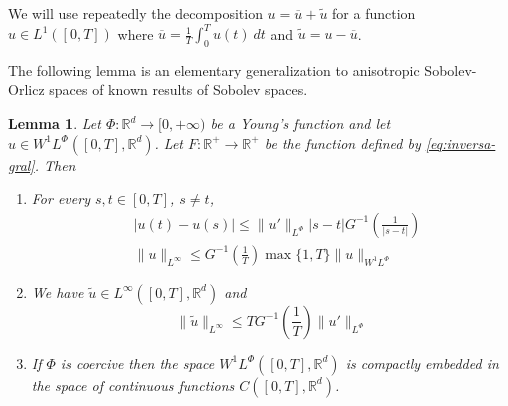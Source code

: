 \documentclass[twoside]{article}
\newtheorem{lem}[thm]{Lemma}
\theoremstyle{remark}
\newcommand{\orlnor}{\|_{L^{\Phi}}}
\newcommand{\linf}{\|_{L^{\infty}}}
\newcommand{\lphi}{L^{\Phi}}
\newcommand{\wphi}{W^{1}\lphi}
\newcommand{\sobnor}{\|_{W^{1}\lphi}}
\newcommand{\rr}{\mathbb{R}}
\renewcommand{\leq}{\leqslant}
\newcounter{example}
\begin{document}
%
%
 We will use repeatedly the decomposition $u=\overline{u}+\widetilde{u}$ for a function $u\in L^1([0,T])$  where $\overline{u} =\frac1T\int_0^T u(t)\ dt$ and $\widetilde{u}=u-\overline{u}$.

 The following lemma is an elementary generalization to anisotropic Sobolev-Orlicz spaces of known results of Sobolev spaces.


%
%
%
%
%
%
%
%
%
%


\begin{lem}\label{inclusion orlicz} Let $\Phi:\rr^d\to [0,+\infty)$ be a Young's 
function and let $u\in\wphi([0,T],\rr^d)$. Let 
$F: \rr^+ \to \rr^+$ be the function defined by \eqref{eq:inversa-gral}. Then 
\begin{enumerate}
\item\label{inclusion orlicz_item1} For every $s,t\in [0,T]$, $s\neq t$,
\begin{align}
 &|u(t)-u(s)| \leq
 \|u'\orlnor |s-t|G^{-1}\left(\frac{1}{|s-t|}\right)\tag{Morrey's inequality}\label{in-sob-cont}
\\
& \| u\linf \leq G^{-1}\left(\frac{1}{T}\right)\max\{1,T\}\|u\sobnor\tag{Sobolev's inequality}\label{sobolev}
\end{align}
\item We have $\widetilde{u}\in L^{\infty}([0,T],\rr^d)$ and
\[
\|\widetilde u \linf \leq T G^{-1}\left(\frac{1}{T}\right)\|u'\orlnor
\tag{Sobolev-Wirtinger's inequality}\label{wirtinger}
\]
\item\label{it:embeding} If $\Phi$ is coercive then the space $\wphi([0,T],\rr^d)$ is compactly embedded in the space of continuous functions $C([0,T],\rr^d)$.
\end{enumerate}
\end{lem}
\end{document}
